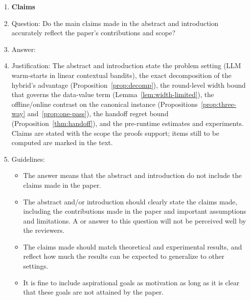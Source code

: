 \documentclass{article}
\theoremstyle{definition}
\theoremstyle{remark}
\theoremstyle{remark}
\begin{document}
\begin{enumerate}

\item {\bf Claims}
    \item[] Question: Do the main claims made in the abstract and introduction accurately reflect the paper's contributions and scope?
    \item[] Answer: \answerYes{} %
    \item[] Justification: The abstract and introduction state the problem setting (LLM warm-starts in linear contextual bandits), the exact decomposition of the hybrid's advantage (Proposition~\ref{prop:decomp}), the round-level width bound that governs the data-value term (Lemma~\ref{lem:width-limited}), the offline/online contrast on the canonical instance (Propositions~\ref{prop:three-way} and~\ref{prop:one-pass}), the handoff regret bound (Proposition~\ref{thm:handoff}), and the pre-runtime estimates and experiments. Claims are stated with the scope the proofs support; items still to be computed are marked in the text.
    \item[] Guidelines:
    \begin{itemize}
        \item The answer \answerNA{} means that the abstract and introduction do not include the claims made in the paper.
        \item The abstract and/or introduction should clearly state the claims made, including the contributions made in the paper and important assumptions and limitations. A \answerNo{} or \answerNA{} answer to this question will not be perceived well by the reviewers. 
        \item The claims made should match theoretical and experimental results, and reflect how much the results can be expected to generalize to other settings. 
        \item It is fine to include aspirational goals as motivation as long as it is clear that these goals are not attained by the paper. 
    \end{itemize}


\end{enumerate}
\end{document}
